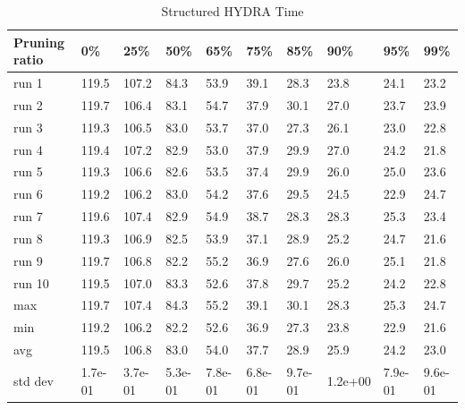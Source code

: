 \documentclass[journal,onecolumn,12pt]{IEEEtran}
\begin{document}
\begin{table}[htbp]
    \caption{Structured HYDRA Time}
    \begin{center}
    \begin{tabular}{ |p{2cm}|p{1cm}|p{1cm}|p{1cm}|p{1cm}|p{1cm}|p{1cm}|p{1cm}|p{1cm}|p{1cm}|  }
     \hline
     Pruning ratio  & 0\% & 25\%& 50\%& 65\%& 75\%& 85\%& 90\%& 95\%& 99\%\\
     \hline
     run 1&119.5&107.2&84.3&53.9&39.1&28.3&23.8&24.1&23.2\\
     run 2&119.7&106.4&83.1&54.7&37.9&30.1&27.0&23.7&23.9\\
     run 3&119.3&106.5&83.0&53.7&37.0&27.3&26.1&23.0&22.8\\
     run 4&119.4&107.2&82.9&53.0&37.9&29.9&27.0&24.2&21.8\\
     run 5&119.3&106.6&82.6&53.5&37.4&29.9&26.0&25.0&23.6\\
     run 6&119.2&106.2&83.0&54.2&37.6&29.5&24.5&22.9&24.7\\
     run 7&119.6&107.4&82.9&54.9&38.7&28.3&28.3&25.3&23.4\\
     run 8&119.3&106.9&82.5&53.9&37.1&28.9&25.2&24.7&21.6\\
     run 9&119.7&106.8&82.2&55.2&36.9&27.6&26.0&25.1&21.8\\
     run 10&119.5&107.0&83.3&52.6&37.8&29.7&25.2&24.2&22.8\\
     \hline
        max     &119.7&107.4&84.3&55.2&39.1&30.1&28.3&25.3&24.7\\
        min     &119.2&106.2&82.2&52.6&36.9&27.3&23.8&22.9&21.6\\
        avg     &119.5&106.8&83.0&54.0&37.7&28.9&25.9&24.2&23.0\\
        std dev &1.7e-01&3.7e-01&5.3e-01&7.8e-01&6.8e-01&9.7e-01&1.2e+00&7.9e-01&9.6e-01\\
     \hline
    \end{tabular}
    \end{center}
    \label{tab:a9}
\end{table}
\end{document}
